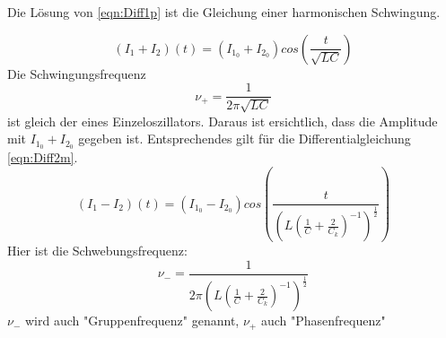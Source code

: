 Die Lösung von \eqref{eqn:Diff1p} ist die Gleichung einer harmonischen Schwingung.

\begin{equation}
  (I_1 + I_2)(t) = (I_{1_{0}} + I_{2_{0}}) cos \left(\frac{t}{\sqrt{LC}}\right)
  \label{eqn:diffi+i}
\end{equation}
Die Schwingungsfrequenz
\begin{equation}
  \nu_+ = \frac{1}{2\pi\sqrt{LC}}
  \label{eqn:nu+}
\end{equation}
ist gleich der eines Einzeloszillators. Daraus ist ersichtlich, dass die Amplitude mit $ I_{1_{0}} + I_{2_{0}} $ gegeben ist. Entsprechendes gilt für die
Differentialgleichung \eqref{eqn:Diff2m}.
\begin{equation}
  (I_1 - I_2)(t) = (I_{1_{0}} - I_{2_{0}}) cos \left(\frac{t}{\left(L\left(\frac{1}{C} + \frac{2}{C_k}\right)^{-1}\right)^{\frac{1}{2}}}\right)
  \label{eqn:diffi-i}
\end{equation}
Hier ist die Schwebungsfrequenz:
\begin{equation}
  \nu_- = \frac{1}{2\pi \left(L\left(\frac{1}{C} + \frac{2}{C_k}\right)^{-1}\right)^{\frac{1}{2}}}
\label{eqn:nu-}
\end{equation}
$\nu_-$ wird auch "Gruppenfrequenz" genannt, $\nu_+$ auch "Phasenfrequenz"

